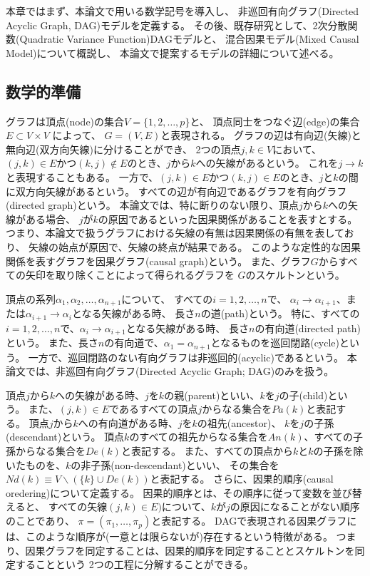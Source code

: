 
本章ではまず、本論文で用いる数学記号を導入し、
非巡回有向グラフ(Directed Acyclic Graph, DAG)モデルを定義する。
その後、既存研究として、2次分散関数(Quadratic Variance Function)DAGモデル\cite{Park2017-hw}と、
混合因果モデル(Mixed Causal Model)\cite{Wenjuan2018-nm}について概説し、
本論文で提案するモデルの詳細について述べる。

\subsection{数学的準備}

グラフは頂点(node)の集合$V=\{1,2,\dots,p\}$と、
頂点同士をつなぐ辺(edge)の集合$E\subset V \times V$ によって、
$G=(V,E)$と表現される。
グラフの辺は有向辺(矢線)と無向辺(双方向矢線)に分けることができ、
2つの頂点$j,k\in V$において、
$(j,k)\in E$かつ$(k,j)\notin E$のとき、$j$から$k$への矢線があるという。
これを$j \rightarrow k$と表現することもある。
一方で、$(j,k)\in E$かつ$(k,j)\in E$のとき、$j$と$k$の間に双方向矢線があるという。
すべての辺が有向辺であるグラフを有向グラフ(directed graph)という。
本論文では、特に断りのない限り、頂点$j$から$k$への矢線がある場合、
$j$が$k$の原因であるといった因果関係があることを表すとする。
つまり、本論文で扱うグラフにおける矢線の有無は因果関係の有無を表しており、
矢線の始点が原因で、矢線の終点が結果である。
このような定性的な因果関係を表すグラフを因果グラフ(causal graph)という。
また、グラフ$G$からすべての矢印を取り除くことによって得られるグラフを
$G$のスケルトンという。

頂点の系列$\alpha_1, \alpha_2, \dots, \alpha_{n+1}$について、
すべての$i=1,2,\dots, n$で、
$\alpha_i \rightarrow \alpha_{i+1}$、または$\alpha_{i+1} \rightarrow \alpha_i$となる矢線がある時、
長さ$n$の道(path)という。
特に、すべての$i=1,2,\dots, n$で、$\alpha_i \rightarrow \alpha_{i+1}$となる矢線がある時、
長さ$n$の有向道(directed path)という。
また、長さ$n$の有向道で、$\alpha_1 = \alpha_{n+1}$となるものを巡回閉路(cycle)という。
一方で、巡回閉路のない有向グラフは非巡回的(acyclic)であるという。
本論文では、非巡回有向グラフ(Directed Acyclic Graph; DAG)のみを扱う。

頂点$j$から$k$への矢線がある時、$j$を$k$の親(parent)といい、$k$を$j$の子(child)という。
また、$(j,k)\in E$であるすべての頂点$j$からなる集合を$Pa(k)$と表記する。
頂点$j$から$k$への有向道がある時、$j$を$k$の祖先(ancestor)、
$k$を$j$の子孫(descendant)という。
頂点$k$のすべての祖先からなる集合を$An(k)$、すべての子孫からなる集合を$De(k)$と表記する。
また、すべての頂点から$k$と$k$の子孫を除いたものを、$k$の非子孫(non-descendant)といい、
その集合を$Nd(k) \equiv V \backslash (\{k \} \cup De(k))$と表記する。
さらに、因果的順序(causal oredering)について定義する。
因果的順序とは、その順序に従って変数を並び替えると、
すべての矢線$(j,k)\in E)$について、$k$が$j$の原因になることがない順序のことであり、
$\pi =(\pi_1, \dots, \pi_p)$と表記する。
DAGで表現される因果グラフには、このような順序が(一意とは限らないが)存在するという特徴がある。
つまり、因果グラフを同定することは、因果的順序を同定することとスケルトンを同定することという
2つの工程に分解することができる。

